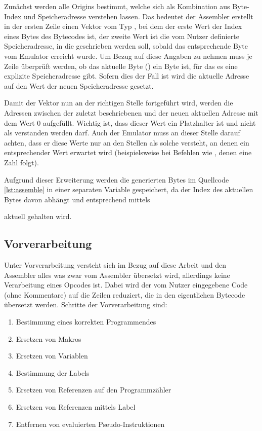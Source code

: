 Zunächst werden alle Origins bestimmt, welche sich als Kombination aus Byte-Index und Speicheradresse verstehen lassen. Das bedeutet der Assembler erstellt in der ersten Zeile einen Vektor vom Typ , bei dem der erste Wert der Index eines Bytes des Bytecodes ist, der zweite Wert ist die vom Nutzer definierte Speicheradresse, in die geschrieben werden soll, sobald das entsprechende Byte vom Emulator erreicht wurde. Um Bezug auf diese Angaben zu nehmen muss je Zeile überprüft werden, ob das aktuelle Byte () ein Byte ist, für das es eine explizite Speicheradresse gibt. Sofern dies der Fall ist wird die aktuelle Adresse auf den Wert der neuen Speicheradresse gesetzt. 

Damit der Vektor nun an der richtigen Stelle fortgeführt wird, werden die Adressen zwischen der zuletzt beschriebenen und der neuen aktuellen Adresse mit dem Wert 0 aufgefüllt. Wichtig ist, dass dieser Wert ein Platzhalter ist und nicht als \grqq{} verstanden werden darf. Auch der Emulator muss an dieser Stelle darauf achten, dass er diese Werte nur an den Stellen als solche versteht, an denen ein entsprechender Wert erwartet wird (beispielsweise bei Befehlen wie , denen eine Zahl folgt).

Aufgrund dieser Erweiterung werden die generierten Bytes im Quellcode \ref{lst:assemble} in einer separaten Variable gespeichert, da der Index des aktuellen Bytes davon abhängt und entsprechend mittels

aktuell gehalten wird.

\subsection{Vorverarbeitung}\label{chap:preprocessor}

Unter Vorverarbeitung versteht sich im Bezug auf diese Arbeit und den Assembler alles was zwar vom Assembler übersetzt wird, allerdings keine Verarbeitung eines Opcodes ist. Dabei wird der vom Nutzer eingegebene Code (ohne Kommentare) auf die Zeilen reduziert, die in den eigentlichen Bytecode übersetzt werden. Schritte der Vorverarbeitung sind:

\begin{enumerate}
	\item Bestimmung eines korrekten Programmendes
	\item Ersetzen von Makros
	\item Ersetzen von Variablen
	\item Bestimmung der Labels
	\item Ersetzen von Referenzen auf den Programmzähler
	\item Ersetzen von Referenzen mittels Label
	\item Entfernen von evaluierten Pseudo-Instruktionen
\end{enumerate}

